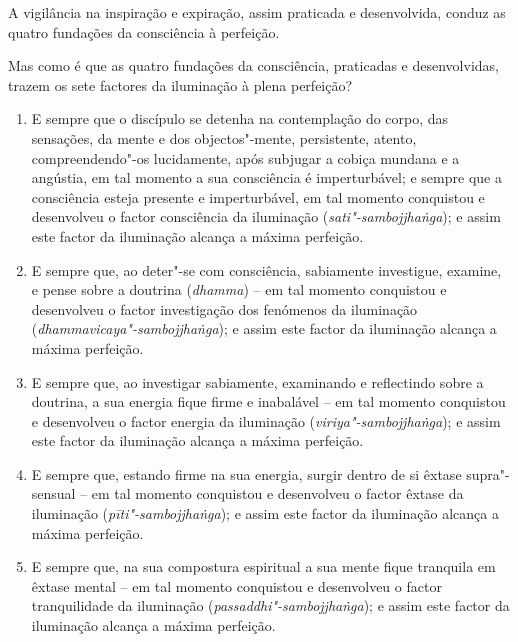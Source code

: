 A vigilância na inspiração e expiração, assim praticada e desenvolvida, conduz
as quatro fundações da consciência à perfeição.

Mas como é que as quatro fundações da consciência, praticadas e desenvolvidas,
trazem os sete factores da iluminação à plena perfeição?

\begin{enumerate}

  \item E sempre que o discípulo se detenha na contemplação do corpo, das
        sensações, da mente e dos objectos"-mente, persistente, atento,
        compreendendo"-os lucidamente, após subjugar a cobiça mundana e a
        angústia, em tal momento a sua consciência é imperturbável; e sempre que
        a consciência esteja presente e imperturbável, em tal momento conquistou
        e desenvolveu o factor consciência da iluminação
        (\emph{sati"-sambojjhaṅga}); e assim este factor da iluminação alcança a
        máxima perfeição.

  \item E sempre que, ao deter"-se com consciência, sabiamente investigue,
        examine, e pense sobre a doutrina (\emph{dhamma}) -- em tal momento
        conquistou e desenvolveu o factor investigação dos fenómenos da
        iluminação (\emph{dhammavicaya"-sambojjhaṅga}); e assim este factor da
        iluminação alcança a máxima perfeição.

  \item E sempre que, ao investigar sabiamente, examinando e reflectindo sobre a
        doutrina, a sua energia fique firme e inabalável -- em tal momento
        conquistou e desenvolveu o factor energia da iluminação
        (\emph{viriya"-sambojjhaṅga}); e assim este factor da iluminação alcança
        a máxima perfeição.

  \item E sempre que, estando firme na sua energia, surgir dentro de si êxtase
        supra"-sensual -- em tal momento conquistou e desenvolveu o factor êxtase
        da iluminação (\emph{pīti"-sambojjhaṅga}); e assim este factor da
        iluminação alcança a máxima perfeição.

  \item E sempre que, na sua compostura espiritual a sua mente fique tranquila
        em êxtase mental -- em tal momento conquistou e desenvolveu o factor
        tranquilidade da iluminação (\emph{passaddhi"-sambojjhaṅga}); e assim
        este factor da iluminação alcança a máxima perfeição.


\end{enumerate}
